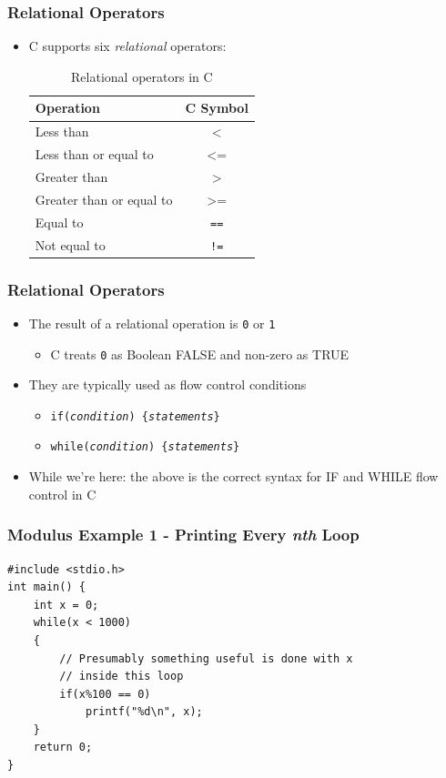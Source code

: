 \documentclass[14pt]{beamer}
\begin{document}
\begin{frame}
\frametitle{Relational Operators}
\begin{itemize}
\item C supports six \textit{relational} operators:
\begin{table}[H]
\centering
\begin{tabular}{|l|c|}
\hline
Operation      & C Symbol \\
\hline
Less than       & $\texttt{<}$        \\
Less than or equal to    & $\texttt{<=}$\\
Greater than & $\texttt{>}$        \\
Greater than or equal to       & $\texttt{>=}$       \\
Equal to & \texttt{==} \\
Not equal to & \texttt{!=} \\
\hline
\end{tabular}
\caption{Relational operators in C}
\end{table}
\end{itemize}
\end{frame}

\begin{frame}
\frametitle{Relational Operators}
\begin{itemize}
\item The result of a relational operation is \texttt{0} or \texttt{1}
	\begin{itemize}
		\item C treats \texttt{0} as Boolean FALSE and non-zero as TRUE
	\end{itemize}
\item They are typically used as flow control conditions
	\begin{itemize}
		\item \texttt{if(\textit{condition}) \{\textit{statements}\}}
		\item \texttt{while(\textit{condition}) \{\textit{statements}\}}
	\end{itemize}
\item While we're here: the above is the correct syntax for IF and WHILE flow control in C
\end{itemize}
\end{frame}

\begin{frame}[fragile]
\frametitle{Modulus Example 1 - Printing Every \textit{nth} Loop}
\begin{lstlisting}[style=CStyle]
#include <stdio.h>
int main() {
	int x = 0;
	while(x < 1000)
	{
		// Presumably something useful is done with x
		// inside this loop
		if(x%100 == 0)
			printf("%d\n", x);
	}
	return 0;
}
\end{lstlisting}
\end{frame}
\end{document}
